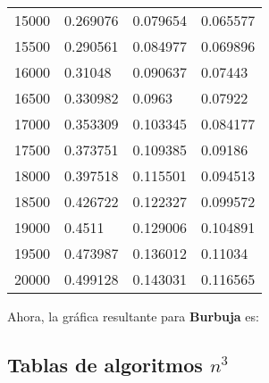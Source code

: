 \documentclass[a4paper, 11pt]{article}
\begin{document}
\begin{tabular}{@{}llll@{}}
15000         & 0.269076 & 0.079654  & 0.065577   \\
15500         & 0.290561 & 0.084977  & 0.069896   \\
16000         & 0.31048  & 0.090637  & 0.07443    \\
16500         & 0.330982 & 0.0963    & 0.07922    \\
17000         & 0.353309 & 0.103345  & 0.084177   \\
17500         & 0.373751 & 0.109385  & 0.09186    \\
18000         & 0.397518 & 0.115501  & 0.094513   \\
18500         & 0.426722 & 0.122327  & 0.099572   \\
19000         & 0.4511   & 0.129006  & 0.104891   \\
19500         & 0.473987 & 0.136012  & 0.11034    \\
20000         & 0.499128 & 0.143031  & 0.116565   \\
\bottomrule
\end{tabular}


Ahora, la gráfica resultante para \textbf{Burbuja} es:
\newpage

\subsection{Tablas de algoritmos $n^3$}
\end{document}
